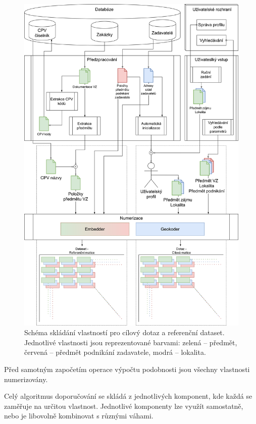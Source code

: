 \documentclass[thesis=M,czech]{FITthesis}[2019/12/23]
\begin{document}
\begin{figure}\centering
	\includegraphics[width=1\textwidth]{images/recommender_features.png}
	\caption[Schéma skládání vlastností pro cílový dotaz a referenční dataset]{Schéma skládání vlastností pro cílový dotaz a referenční dataset. Jednotlivé vlastnosti jsou reprezentované barvami: zelená -- předmět, červená -- předmět podnikání zadavatele, modrá -- lokalita.}\label{fig:recommenderfeatures}
\end{figure}

Před samotným započetím operace výpočtu podobnosti jsou všechny vlastnosti numerizovány.

Celý algoritmus doporučování se skládá z jednotlivých komponent, kde každá se zaměřuje na určitou vlastnost. Jednotlivé komponenty lze využít samostatně, nebo je libovolně kombinovat s různými váhami.
\end{document}
